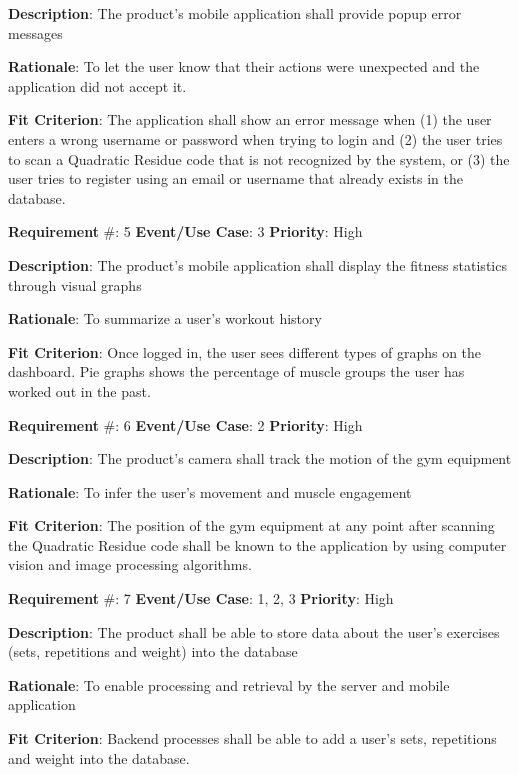 \documentclass{article}
\newcommand\tab{\hspace*{2cm}}
\begin{document}
\textbf{Description}: The product’s mobile application shall provide popup error messages

\textbf{Rationale}: To let the user know that their actions were unexpected and the application did not accept it.

\textbf{Fit Criterion}: The application shall show an error message when (1) the user enters a wrong username or password when trying to login and (2) the user tries to scan a Quadratic Residue code that is not recognized by the system, or (3) the user tries to register using an email or username that already exists in the database.

\medskip

\textbf{Requirement} \#: 5 \tab \textbf{Event/Use Case}: 3
\tab \textbf{Priority}: High

\textbf{Description}: The product’s mobile application shall display the fitness statistics through visual graphs

\textbf{Rationale}: To summarize a user’s workout history

\textbf{Fit Criterion}: Once logged in, the user sees different types of graphs on the dashboard. Pie graphs shows the percentage of muscle groups the user has worked out in the past. 

\medskip

\textbf{Requirement} \#: 6 \tab \textbf{Event/Use Case}: 2
\tab \textbf{Priority}: High

\textbf{Description}: The product’s camera shall track the motion of the gym equipment

\textbf{Rationale}: To infer the user's movement and muscle engagement

\textbf{Fit Criterion}: The position of the gym equipment at any point after scanning the Quadratic Residue code shall be known to the application by using computer vision and image processing algorithms.

\medskip

\textbf{Requirement} \#: 7 \tab \textbf{Event/Use Case}: 1, 2, 3
\tab \textbf{Priority}: High

\textbf{Description}: The product shall be able to store data about the user’s exercises (sets, repetitions and weight) into the database

\textbf{Rationale}: To enable processing and retrieval by the server and mobile application

\textbf{Fit Criterion}: Backend processes shall be able to add a user’s sets, repetitions and weight into the database.
\end{document}
